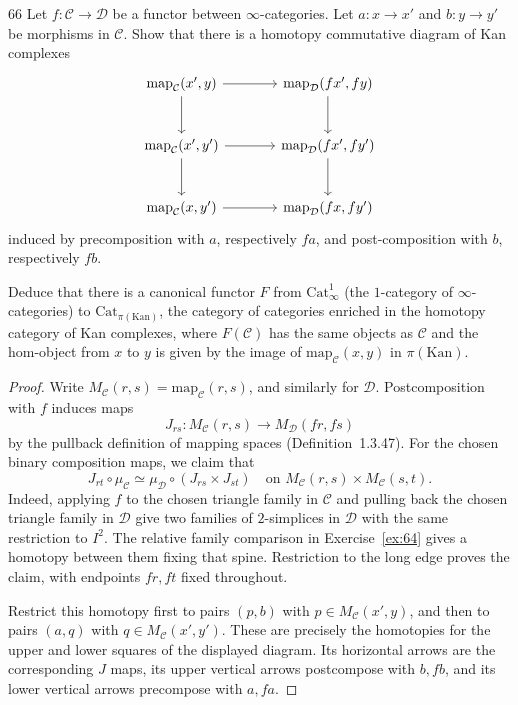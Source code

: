 \begin{exercise}{66}
Let $f\colon\mathcal C\to\mathcal D$ be a functor between $\infty$-categories. Let $a\colon x\to x'$ and $b\colon y\to y'$ be morphisms in $\mathcal C$. Show that there is a homotopy commutative diagram of Kan complexes
\[
 \begin{tikzcd}[column sep=large,row sep=large]
  \mathrm{map}_{\mathcal C}(x',y) \arrow[r] \arrow[d]
    & \mathrm{map}_{\mathcal D}(fx',fy) \arrow[d] \\
  \mathrm{map}_{\mathcal C}(x',y') \arrow[r] \arrow[d]
    & \mathrm{map}_{\mathcal D}(fx',fy') \arrow[d] \\
  \mathrm{map}_{\mathcal C}(x,y') \arrow[r]
    & \mathrm{map}_{\mathcal D}(fx,fy')
 \end{tikzcd}
\]
induced by precomposition with $a$, respectively $fa$, and post-composition with $b$, respectively $fb$.

Deduce that there is a canonical functor $F$ from $\mathrm{Cat}^1_\infty$ (the $1$-category of $\infty$-categories) to $\mathrm{Cat}_{\pi(\mathrm{Kan})}$, the category of categories enriched in the homotopy category of Kan complexes, where $F(\mathcal C)$ has the same objects as $\mathcal C$ and the hom-object from $x$ to $y$ is given by the image of $\mathrm{map}_{\mathcal C}(x,y)$ in $\pi(\mathrm{Kan})$.

\begin{proof}
Write $M_{\mathcal C}(r,s)=\mathrm{map}_{\mathcal C}(r,s)$,
and similarly for $\mathcal D$.
Postcomposition with $f$ induces maps
\[
 J_{rs}\colon M_{\mathcal C}(r,s)
       \longrightarrow M_{\mathcal D}(fr,fs)
\]
by the pullback definition of mapping spaces
(Definition~1.3.47).
For the chosen binary composition maps, we claim that
\[
 J_{rt}\circ\mu_{\mathcal C}
 \simeq
 \mu_{\mathcal D}\circ(J_{rs}\times J_{st})
 \quad\text{on }M_{\mathcal C}(r,s)\times M_{\mathcal C}(s,t).
\]
Indeed, applying $f$ to the chosen triangle family in
$\mathcal C$ and pulling back the chosen triangle family
in $\mathcal D$ give two families of $2$-simplices in
$\mathcal D$ with the same restriction to $I^2$.
The relative family comparison in Exercise~\ref{ex:64}
gives a homotopy between them fixing that spine.
Restriction to the long edge proves the claim, with
endpoints $fr,ft$ fixed throughout.

Restrict this homotopy first to pairs $(p,b)$ with
$p\in M_{\mathcal C}(x',y)$, and then to pairs $(a,q)$
with $q\in M_{\mathcal C}(x',y')$.
These are precisely the homotopies for the upper and
lower squares of the displayed diagram.
Its horizontal arrows are the corresponding $J$ maps,
its upper vertical arrows postcompose with $b,fb$,
and its lower vertical arrows precompose with $a,fa$.


\end{proof}
\end{exercise}

